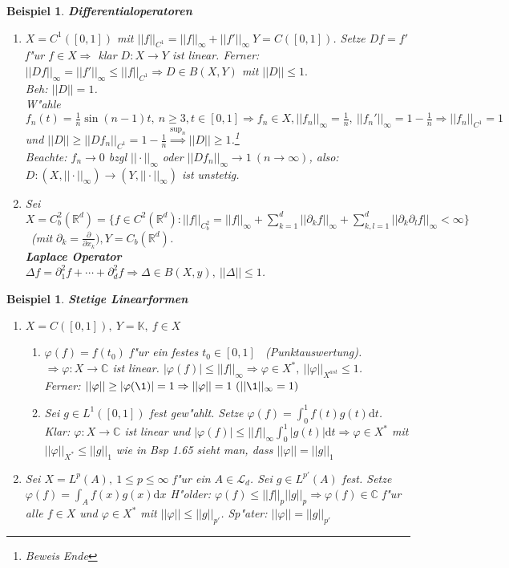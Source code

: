 \documentclass[a4paper,11pt]{book}
\newcommand{\R}{{\mathbb R}}
\newcommand{\C}{{\mathbb C}}
\newcommand{\K}{{\mathbb K}}
\newcommand{\sL}{{\mathcal L}}
\newcommand{\sn}[1]{||#1||_{\infty}}
\def\d{\mbox{d}}
\newtheorem{Bsp}[Def]{Beispiel}
\theoremstyle{nonumberplain}
\begin{document}
\begin{Bsp}
\textbf{Differentialoperatoren}
\begin{enumerate}
\item[a)] $X = C^1([0,1])$ mit $||f||_{C^1} = \sn{f} + \sn{f'} \ Y = C([0,1])$. Setze $Df = f'$ f"ur $f \in X \Rightarrow$ klar $D: X \rightarrow Y$ ist linear. Ferner: $\sn{Df} = \sn{f'} \leq ||f||_{C^1} \Rightarrow D \in B(X,Y)$ mit $||D|| \leq 1.$\\
\emph{Beh:} $||D|| = 1$.\\
W"ahle $f_n(t) = \frac1{n} \sin(n-1)t,\ n \geq 3, t \in [0,1] \Rightarrow f_n \in X, \sn{f_n} = \frac1{n}, \ \sn{f_n'} = 1 - \frac1{n} \Rightarrow ||f_n||_{C^1} = 1$ und $||D|| \geq ||Df_n||_{C^1} = 1 - \frac1{n} \stackrel{\sup_n}{\Rightarrow} ||D|| \geq 1$.\footnote{Beweis Ende}\\
Beachte: $f_n \rightarrow 0$ bzgl $\sn{\cdot}$ oder $\sn{Df_n} \rightarrow 1 \ (n \rightarrow \infty)$, also: $D: (X, \sn{\cdot}) \rightarrow (Y, \sn{\cdot})$ ist unstetig.
\item[b)] Sei $X = C_b^2(\R^d) = \{ f \in C^2(\R^d): ||f||_{C_b^2} = \sn{f} + \sum_{k=1}^d \sn{\partial_k f} + \sum_{k,l=1}^d \sn{\partial_k \partial_l f} < \infty \}$ \ (mit $\partial_k =\frac{\partial}{\partial x_k}), Y = C_b(\R^d)$.\\
\textbf{Laplace Operator}\\
$\Delta f = \partial_1^2 f + \cdots + \partial_d^2 f \Rightarrow \Delta \in B(X,y),\ ||\Delta|| \leq 1$.
\end{enumerate}
\end{Bsp}

\begin{Bsp}
\textbf{Stetige Linearformen}
\begin{enumerate}
\item[a)] $X = C([0,1]),\ Y = \K,\ f \in X$
\begin{enumerate}
\item[(i)] $\varphi(f) = f(t_0)$ f"ur ein festes $t_0 \in [0,1]$ \ (Punktauswertung).\ $\Rightarrow \varphi: X \rightarrow \C$ ist linear. $|\varphi(f)| \leq \sn{f} \Rightarrow \varphi \in X^{\ast},\ ||\varphi||_{X^{ast}} \leq 1$.\\
Ferner: $||\varphi|| \geq |\varphi(\1)| = 1 \Rightarrow || \varphi || = 1 \ (\sn{\1} = 1)$
\item[(ii)] Sei $g \in L^1([0,1])$ fest gew"ahlt. Setze $\varphi(f) = \int_0^1 f(t)g(t) \d t$. Klar: $\varphi: X \rightarrow \C$ ist linear und $|\varphi(f)| \leq \sn{f} \int_0^1 |g(t)| \d t \Rightarrow \varphi \in X^{\ast}$ mit $||\varphi||_{X^{\ast}} \leq ||g||_1$ wie in Bsp 1.65 sieht man, dass $||\varphi|| = ||g||_1$
\end{enumerate}
\item[b)] Sei $X = L^p(A),\ 1 \leq p \leq \infty$ f"ur ein $A \in \sL_d$. Sei $g \in L^{p'}(A)$ fest. Setze $\varphi(f) = \int_A f(x)g(x)\d x$ H"older: $\varphi(f) \leq ||f||_p ||g||_p \Rightarrow \varphi(f) \in \C$ f"ur alle $f \in X$ und $\varphi \in X^{\ast}$ mit $||\varphi|| \leq ||g||_{p'}$. Sp"ater: $||\varphi|| = ||g||_{p'}$
\end{enumerate}
\end{Bsp}
\end{document}
